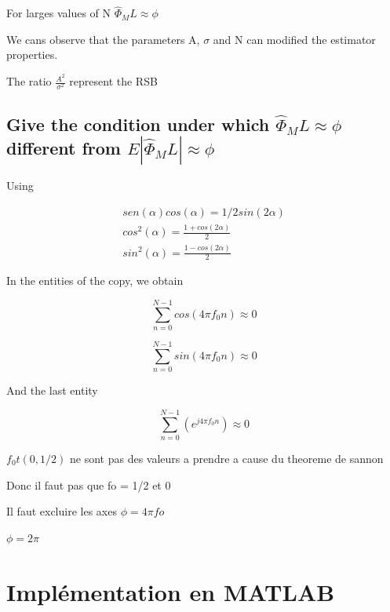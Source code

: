 \documentclass{report}
\begin{document}
For larges values of N $ \hat{\Phi}_ML \approx \phi $

We cans observe that the parameters A, $ \sigma $ and N can modified
the estimator properties.

The ratio $ \frac{A^2}{\sigma^2} $ represent the RSB %

\section{Give the condition under which $ \hat{\Phi}_ML \approx \phi $ different from $ E|\hat{\Phi}_ML| \approx \phi $ }

Using

\begin{gather*}
sen(\alpha)cos(\alpha) = 1/2 sin(2\alpha)\\
cos^2(\alpha) = \frac{1+cos(2\alpha)}{2}\\
sin^2(\alpha) = \frac{1-cos(2\alpha)}{2}
\end{gather*}

In the entities of the copy, we obtain 

\begin{equation}\label{key}
\sum_{n=0}^{N-1}cos(4\pi f_0 n) \approx 0
\end{equation}

\begin{equation}\label{key}
\sum_{n=0}^{N-1}sin(4\pi f_0 n) \approx 0
\end{equation}

And the last entity 

\begin{equation}\label{key}
\sum_{n=0}^{N-1}(e^{j4\pi f_0n}) \approx 0
\end{equation}


$ f_0t(0,1/2) $ ne sont pas des valeurs a prendre a cause du theoreme de sannon

Donc il faut pas que fo = 1/2 et 0

Il faut excluire les axes
$ \phi = 4\pi fo  $

$ \phi = 2\pi $

\chapter{Implémentation en MATLAB{\small \circledR}}
\end{document}
